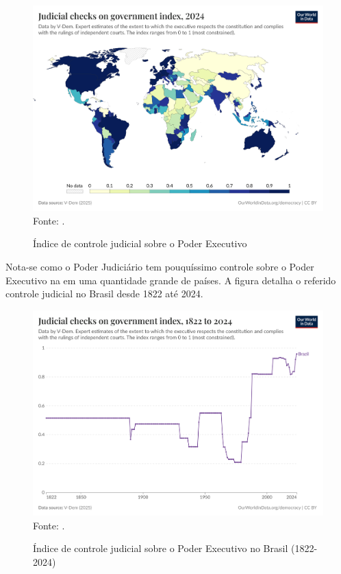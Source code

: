 \begin{figure}[H]
	\centering
	\caption{Índice de controle judicial sobre o Poder Executivo}
	\includegraphics[width=1\linewidth]{figuras/judicial-constraints-on-the-executive-index}
	\label{fig:judicial-constraints-on-the-executive-index}
	\footnotesize{Fonte: \cite{jus_constraints_on_gov}.}
\end{figure}

Nota-se como o Poder Judiciário tem pouquíssimo controle sobre o Poder Executivo na em uma quantidade grande de países. A figura detalha o referido controle judicial no Brasil desde 1822 até 2024.

\begin{figure}[H]
    \centering
    \caption{Índice de controle judicial sobre o Poder Executivo no Brasil (1822-2024)}
    \includegraphics[width=1\linewidth]{figuras/judicial-constraints-on-the-executive-index-brazil}
    \label{fig:judicial-constraints-on-the-executive-index-brazil}
    \footnotesize{Fonte: \cite{jus_constraints_on_gov}.}
\end{figure}

